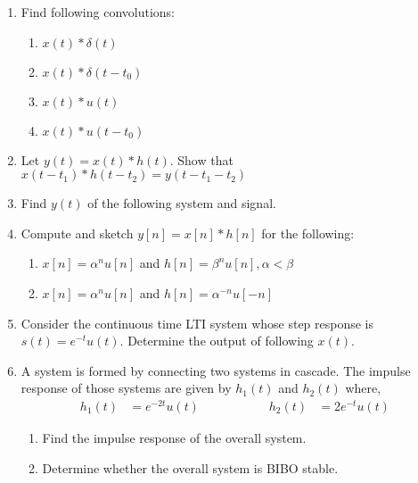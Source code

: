 \documentclass[12pt]{article}
\begin{document}
\begin{enumerate}
\item Find following convolutions:
\begin{enumerate}
    \item $x(t)\ast\delta(t)$
    \item $x(t)\ast\delta(t-t_0)$
    \item $x(t)\ast u(t)$
    \item $x(t)\ast u(t-t_0)$
\end{enumerate}

\item Let $y(t) = x(t)\ast h(t)$. Show that $x(t-t_1)\ast h(t-t_2) = y(t-t_1-t_2)$

\item Find $y(t)$ of the following system and signal.

\begin{figure}[h]
    \centering
    
\caption{}
\end{figure}

\item Compute and sketch $y[n] = x[n]\ast h[n]$ for the following:

\begin{enumerate}
    \item $ x[n] = \alpha^{n}u[n]$ \hspace{1cm} and \hspace{1cm} $h[n] = \beta^{n}u[n] , \alpha < \beta$
    \item $x[n] = \alpha^{n}u[n]$  \hspace{1cm} and \hspace{1cm} $h[n] = \alpha^{-n}u[-n]$
\end{enumerate}

\item Consider the continuous time LTI system whose step response is $s(t) = e^{-t}u(t)$. Determine the output of following $x(t)$.

\begin{figure}[h]
    \centering
    
\caption{}
\end{figure}

\item A system is formed by connecting two systems in cascade. The impulse response of those systems are given by $h_{1}(t)$ and $h_{2}(t)$ where,
     \begin{align*}
        h_1(t) &= e^{-2t}u(t)&\hspace{2cm} h_2(t) &= 2e^{-t}u(t)
     \end{align*}
\begin{enumerate}
    \item Find the impulse response of the overall system.
    \item Determine whether the overall system is BIBO stable.
\end{enumerate}


\end{enumerate}
\end{document}
